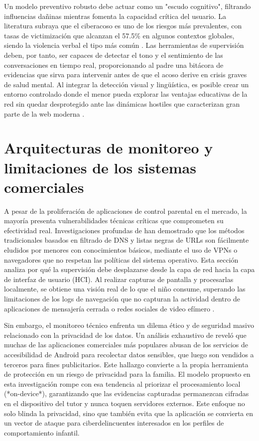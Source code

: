Un modelo preventivo robusto debe actuar como un "escudo cognitivo", filtrando influencias dañinas mientras fomenta la capacidad crítica del usuario. La literatura subraya que el ciberacoso es uno de los riesgos más prevalentes, con tasas de victimización que alcanzan el 57.5\% en algunos contextos globales, siendo la violencia verbal el tipo más común \cite{zhu_cyberbullying_2021}. Las herramientas de supervisión deben, por tanto, ser capaces de detectar el tono y el sentimiento de las conversaciones en tiempo real, proporcionando al padre una bitácora de evidencias que sirva para intervenir antes de que el acoso derive en crisis graves de salud mental. Al integrar la detección visual y lingüística, es posible crear un entorno controlado donde el menor pueda explorar las ventajas educativas de la red sin quedar desprotegido ante las dinámicas hostiles que caracterizan gran parte de la web moderna \cite{youssef_online_2025}.

\section{Arquitecturas de monitoreo y limitaciones de los sistemas comerciales}

A pesar de la proliferación de aplicaciones de control parental en el mercado, la mayoría presenta vulnerabilidades técnicas críticas que comprometen su efectividad real. Investigaciones profundas de \cite{rojas_technical_2025} han demostrado que los métodos tradicionales basados en filtrado de DNS y listas negras de URLs son fácilmente eludidos por menores con conocimientos básicos, mediante el uso de VPNs o navegadores que no respetan las políticas del sistema operativo. Esta sección analiza por qué la supervisión debe desplazarse desde la capa de red hacia la capa de interfaz de usuario (HCI). Al realizar capturas de pantalla y procesarlas localmente, se obtiene una visión real de lo que el niño consume, superando las limitaciones de los logs de navegación que no capturan la actividad dentro de aplicaciones de mensajería cerrada o redes sociales de video efímero \cite{koulaxidis_improving_2022}.

Sin embargo, el monitoreo técnico enfrenta un dilema ético y de seguridad masivo relacionado con la privacidad de los datos. Un análisis exhaustivo de \cite{feal_angel_2020} reveló que muchas de las aplicaciones comerciales más populares abusan de los servicios de accesibilidad de Android para recolectar datos sensibles, que luego son vendidos a terceros para fines publicitarios. Este hallazgo convierte a la propia herramienta de protección en un riesgo de privacidad para la familia. El modelo propuesto en esta investigación rompe con esa tendencia al priorizar el procesamiento local (*on-device*), garantizando que las evidencias capturadas permanezcan cifradas en el dispositivo del tutor y nunca toquen servidores externos. Este enfoque no solo blinda la privacidad, sino que también evita que la aplicación se convierta en un vector de ataque para ciberdelincuentes interesados en los perfiles de comportamiento infantil.

